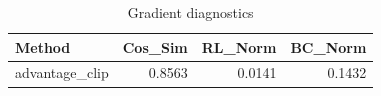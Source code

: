\begin{table}[htbp]
\centering
\caption{Gradient diagnostics}
\label{tab:grad-diag}
\begin{tabular}{lrrr}
\toprule
\textbf{Method} & \textbf{Cos\_Sim} & \textbf{RL\_Norm} & \textbf{BC\_Norm} \\
\midrule
advantage\_clip & 0.8563 & 0.0141 & 0.1432 \\
\bottomrule
\end{tabular}
\end{table}